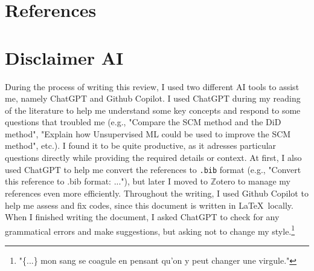 \documentclass[11pt,a4paper]{article}
\begin{document}
\newpage

\section*{References}

\printbibliography[heading=none]
\newpage

\section*{Disclaimer AI}

\hspace{1cm}During the process of writing this review, I used two different AI tools to assist me, namely ChatGPT and Github Copilot.
I used ChatGPT during my reading of the literature to help me understand some key concepts and respond to some questions that troubled me (e.g., "Compare the SCM method and the DiD method", "Explain how Unsupervised ML could be used to improve the SCM method", etc.).
I found it to be quite productive, as it adresses particular questions directly while providing the required details or context.
At first, I also used ChatGPT to help me convert the references to \texttt{.bib} format (e.g., "Convert this reference to .bib format: ..."), but later I moved to $\mathbb{Z}$otero to manage my references even more efficiently.
Throughout the writing, I used Github Copilot to help me assess and fix codes, since this document is written in \LaTeX\ locally.
When I finished writing the document, I asked ChatGPT to check for any grammatical errors and make suggestions, but asking not to change my style.\footnote{"\{...\} mon sang se coagule en pensant qu’on y peut changer une virgule."}
\end{document}

